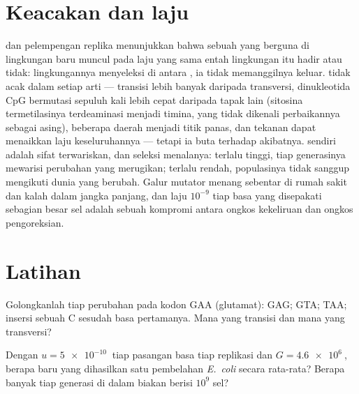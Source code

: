 \section{Keacakan dan laju}

\begin{proposition}\label{prop:b2:genome-diversification:random}
 dan pelempengan replika menunjukkan bahwa sebuah 
yang berguna di lingkungan baru muncul pada laju yang sama entah
lingkungan itu hadir atau tidak: lingkungannya menyeleksi di antara
, ia tidak memanggilnya keluar.  tidak acak dalam
setiap arti --- transisi lebih banyak daripada transversi, dinukleotida
CpG bermutasi sepuluh kali lebih cepat daripada tapak lain (sitosina
termetilasinya terdeaminasi menjadi timina, yang tidak dikenali
perbaikannya sebagai asing), beberapa daerah menjadi titik panas, dan
tekanan dapat menaikkan laju keseluruhannya --- tetapi ia buta terhadap
akibatnya.  sendiri adalah sifat terwariskan, dan
seleksi menalanya: terlalu tinggi, tiap generasinya mewarisi perubahan
yang merugikan; terlalu rendah, populasinya tidak sanggup mengikuti
dunia yang berubah. Galur mutator menang sebentar di rumah sakit dan
kalah dalam jangka panjang, dan laju $10^{-9}$ tiap basa yang
disepakati sebagian besar sel adalah sebuah kompromi antara ongkos
kekeliruan dan ongkos pengoreksian.
\end{proposition}

\section{Latihan}

\begin{exercise}[$\star$]\label{exo:b2:genome-diversification:1}
Golongkanlah tiap perubahan pada kodon GAA (glutamat): GAG; GTA; TAA;
insersi sebuah C sesudah basa pertamanya. Mana yang transisi dan mana
yang transversi?
\end{exercise}

\begin{exercise}[$\star$]\label{exo:b2:genome-diversification:2}
Dengan $u = \qty{5e-10}{}$ tiap pasangan basa tiap replikasi dan $G =
\qty{4.6e6}{}$, berapa  baru yang dihasilkan satu pembelahan
\emph{E.~coli} secara rata-rata? Berapa banyak tiap generasi di dalam
biakan berisi $10^{9}$ sel?
\end{exercise}

